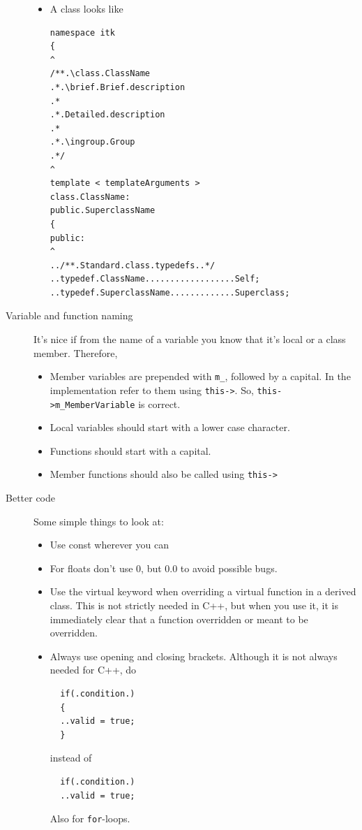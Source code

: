 \documentclass[]{report}
\begin{document}
\begin{description}
\begin{itemize}
\item A class looks like
\begin{verbatim}
namespace itk
{
^
/**.\class.ClassName
.*.\brief.Brief.description
.*
.*.Detailed.description
.*
.*.\ingroup.Group
.*/
^
template < templateArguments >
class.ClassName:
public.SuperclassName
{
public:
^
../**.Standard.class.typedefs..*/
..typedef.ClassName..................Self;
..typedef.SuperclassName.............Superclass;
\end{verbatim}
\end{itemize}

\item[Variable and function naming] It's nice if from the name of a variable you know
that it's local or a class member. Therefore,

\begin{itemize}
\item Member variables are prepended with \texttt{m\_}, followed by
a capital. In the implementation refer to them using
\verb|this->|. So, \verb|this->m_MemberVariable| is correct.

\item Local variables should start with a lower case character.

\item Functions should start with a capital.

\item Member functions should also be called using \texttt{this->}
\end{itemize}

\item[Better code] Some simple things to look at:

\begin{itemize}
\item Use const wherever you can

\item For floats don't use 0, but 0.0 to avoid possible bugs.

\item Use the virtual keyword when overriding a virtual function in a derived
class. This is not strictly needed in C++, but when you use it, it is immediately
clear that a function overridden or meant to be overridden.

\item Always use opening and closing brackets. Although it is not always needed for C++, do
\begin{verbatim}
  if(.condition.)
  {
  ..valid = true;
  }
\end{verbatim}
instead of
\begin{verbatim}
  if(.condition.)
  ..valid = true;
\end{verbatim}
Also for \texttt{for}-loops.
\end{itemize}


\end{description}
\end{document}
